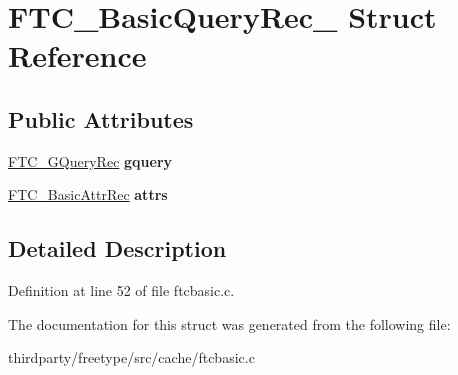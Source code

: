 \hypertarget{struct_f_t_c___basic_query_rec__}{}\section{F\+T\+C\+\_\+\+Basic\+Query\+Rec\+\_\+ Struct Reference}
\label{struct_f_t_c___basic_query_rec__}
\subsection*{Public Attributes}
\begin{DoxyCompactItemize}
\item 
\mbox{\label{struct_f_t_c___basic_query_rec___a6f68bd16488f4f6ed11d07ee023a5999}} 
\hyperlink{struct_f_t_c___g_query_rec__}{F\+T\+C\+\_\+\+G\+Query\+Rec} {\bfseries gquery}
\item 
\mbox{\label{struct_f_t_c___basic_query_rec___a03aaf982820ab824530bcf27894ce43b}} 
\hyperlink{struct_f_t_c___basic_attr_rec__}{F\+T\+C\+\_\+\+Basic\+Attr\+Rec} {\bfseries attrs}
\end{DoxyCompactItemize}


\subsection{Detailed Description}


Definition at line 52 of file ftcbasic.\+c.



The documentation for this struct was generated from the following file\+:\begin{DoxyCompactItemize}
\item 
thirdparty/freetype/src/cache/ftcbasic.\+c\end{DoxyCompactItemize}
